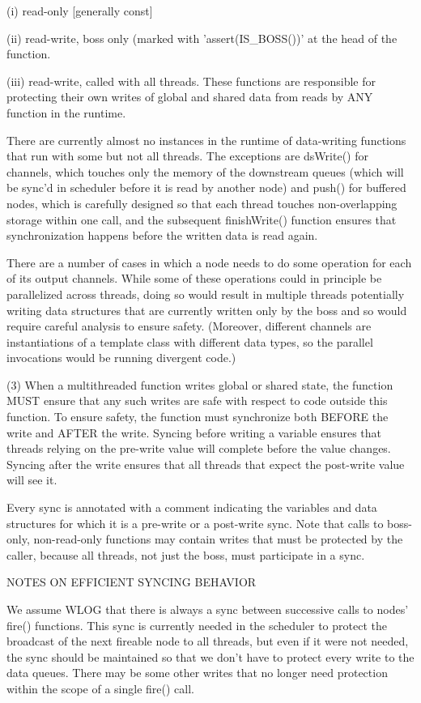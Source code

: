   (i) read-only [generally const]

  (ii) read-write, boss only (marked with 'assert(IS_BOSS())' at the
       head of the function.

  (iii) read-write, called with all threads.  These functions are
      responsible for protecting their own writes of global and shared
      data from reads by ANY function in the runtime.

There are currently almost no instances in the runtime of data-writing
functions that run with some but not all threads.  The exceptions are
dsWrite() for channels, which touches only the memory of the
downstream queues (which will be sync'd in scheduler before it is read
by another node) and push() for buffered nodes, which is carefully
designed so that each thread touches non-overlapping storage within
one call, and the subsequent finishWrite() function ensures that
synchronization happens before the written data is read again.

There are a number of cases in which a node needs to do some operation
for each of its output channels.  While some of these operations could
in principle be parallelized across threads, doing so would result in
multiple threads potentially writing data structures that are
currently written only by the boss and so would require careful
analysis to ensure safety.  (Moreover, different channels are
instantiations of a template class with different data types, so the
parallel invocations would be running divergent code.)

(3) When a multithreaded function writes global or shared state, the
function MUST ensure that any such writes are safe with respect to
code outside this function.  To ensure safety, the function must
synchronize both BEFORE the write and AFTER the write.  Syncing before
writing a variable ensures that threads relying on the pre-write value
will complete before the value changes.  Syncing after the write
ensures that all threads that expect the post-write value will see it.

Every sync is annotated with a comment indicating the variables and
data structures for which it is a pre-write or a post-write sync. Note
that calls to boss-only, non-read-only functions may contain writes
that must be protected by the caller, because all threads, not just
the boss, must participate in a sync.

NOTES ON EFFICIENT SYNCING BEHAVIOR

We assume WLOG that there is always a sync between successive calls to
nodes' fire() functions.  This sync is currently needed in the
scheduler to protect the broadcast of the next fireable node to all
threads, but even if it were not needed, the sync should be maintained
so that we don't have to protect every write to the data queues.
There may be some other writes that no longer need protection within
the scope of a single fire() call.


